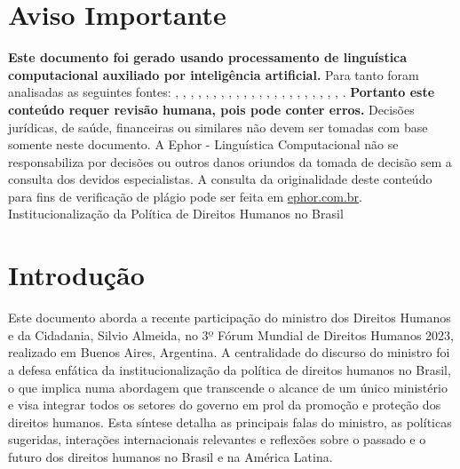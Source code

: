 \documentclass[
   article,       
   12pt,          
   oneside,       
   a4paper,       
   english,       
   brazil,        
   sumario=tradicional
   ]{abntex2}
\begin{document}
\frenchspacing 
\maketitle

\textual
\section{Aviso Importante}
\textbf{Este documento foi gerado usando processamento de linguística computacional auxiliado por inteligência artificial.} Para tanto foram analisadas as seguintes fontes:  \cite{A_CAUSA_E_AS_POLITICAS_DE_DIREITOS_HUMANOS_NO}, \cite{Ciclo_de_Politicas_Publicas_por_que_e_importa}, \cite{Conheca_o_ciclo_das_politicas_publicas__Polit}, \cite{Educacao_Inclusiva_Conheca_o_historico_da_leg}, \cite{Em_Buenos_Aires_Silvio_Almeida_defende_a_inst}, \cite{Entendendo_a_Tipologia_de_Politicas_Publicas_}, \cite{Escola_Nacional_de_Administracao_Publica__Wik}, \cite{Especialista_em_politicas_publicas_e_gestao_g}, \cite{FEDERALISMO_E_POLITICAS_PUBLICAS_NO_BRASIL_Ho}, \cite{Institucionalizacao_das_politicas_em_Direitos}, \cite{Ministerio_do_Planejamento_e_Orcamento__Wikip}, \cite{Ministro_defende_que_direitos_humanos_precisa}, \cite{Politica_conceito_politicas_publicas_e_partid}, \cite{Politica_publica__o_que_e_tipos_de_politicas_}, \cite{Politica_publica__Wikipedia_a_enciclopedia_li}, \cite{Politicas_publicas__Wikipedia_la_enciclopedia}, \cite{Politicas_Publicas_entenda_o_que_sao_para_que}, \cite{Politicas_Publicas_o_que_sao_e_para_que_serve}, \cite{Politicas_publicas_o_que_sao_e_para_que_serve}, \cite{Politicas_publicas_o_que_sao_quem_faz_e_tipos}, \cite{Politicas_publicas_o_que_sao_tipos_e_exemplos}, \cite{Revista_USP_119__Dossie_1_Democracia_e_politi}, \cite{TCU_Ciclo_das_politicas_publicas__Tudo_o_que_}.
\textbf{Portanto este conteúdo requer revisão humana, pois pode conter erros.} Decisões jurídicas, de saúde, financeiras ou similares não devem ser tomadas com base somente neste documento. A Ephor - Linguística Computacional não se responsabiliza por decisões ou outros danos oriundos da tomada de decisão sem a consulta dos devidos especialistas.
A consulta da originalidade deste conteúdo para fins de verificação de plágio pode ser feita em \href{http://www.ephor.com.br}{ephor.com.br}.
Institucionalização da Política de Direitos Humanos no Brasil

\section{Introdução}
Este documento aborda a recente participação do ministro dos Direitos Humanos e da Cidadania, Silvio Almeida, no 3º Fórum Mundial de Direitos Humanos 2023, realizado em Buenos Aires, Argentina. A centralidade do discurso do ministro foi a defesa enfática da institucionalização da política de direitos humanos no Brasil, o que implica numa abordagem que transcende o alcance de um único ministério e visa integrar todos os setores do governo em prol da promoção e proteção dos direitos humanos. Esta síntese detalha as principais falas do ministro, as políticas sugeridas, interações internacionais relevantes e reflexões sobre o passado e o futuro dos direitos humanos no Brasil e na América Latina.
\end{document}
